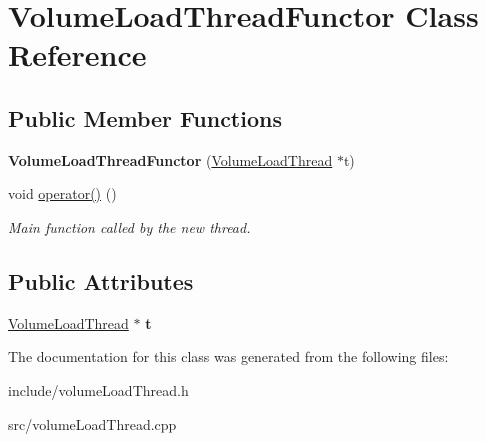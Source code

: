 \hypertarget{classVolumeLoadThreadFunctor}{
\section{\-Volume\-Load\-Thread\-Functor \-Class \-Reference}
\label{d0/d41/classVolumeLoadThreadFunctor}
}
\subsection*{\-Public \-Member \-Functions}
\begin{DoxyCompactItemize}
\item 
\hypertarget{classVolumeLoadThreadFunctor_acac4f75da2889f457aa09617d4bf632c}{
{\bfseries \-Volume\-Load\-Thread\-Functor} (\hyperlink{classVolumeLoadThread}{\-Volume\-Load\-Thread} $\ast$t)}
\label{d0/d41/classVolumeLoadThreadFunctor_acac4f75da2889f457aa09617d4bf632c}

\item 
\hypertarget{classVolumeLoadThreadFunctor_aa0d82de951f3ad78504a03dd76f708ec}{
void \hyperlink{classVolumeLoadThreadFunctor_aa0d82de951f3ad78504a03dd76f708ec}{operator()} ()}
\label{d0/d41/classVolumeLoadThreadFunctor_aa0d82de951f3ad78504a03dd76f708ec}

\begin{DoxyCompactList}\small\item\em \-Main function called by the new thread. \end{DoxyCompactList}\end{DoxyCompactItemize}
\subsection*{\-Public \-Attributes}
\begin{DoxyCompactItemize}
\item 
\hypertarget{classVolumeLoadThreadFunctor_a8cc56fe513fe8a54b95b07b044608d84}{
\hyperlink{classVolumeLoadThread}{\-Volume\-Load\-Thread} $\ast$ {\bfseries t}}
\label{d0/d41/classVolumeLoadThreadFunctor_a8cc56fe513fe8a54b95b07b044608d84}

\end{DoxyCompactItemize}


\-The documentation for this class was generated from the following files\-:\begin{DoxyCompactItemize}
\item 
include/volume\-Load\-Thread.\-h\item 
src/volume\-Load\-Thread.\-cpp\end{DoxyCompactItemize}
